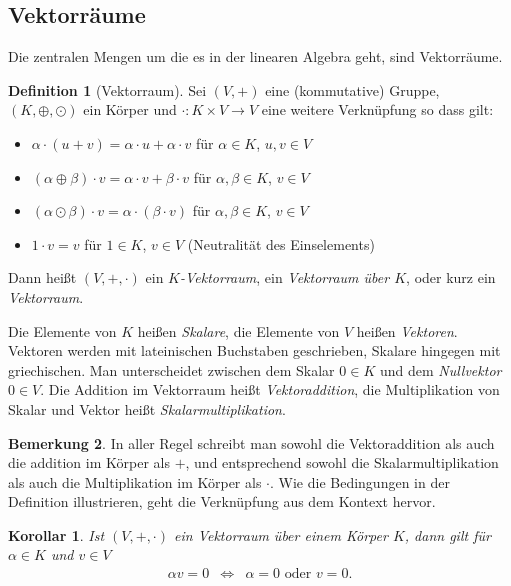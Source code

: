 \documentclass[index=totoc]{scrartcl}%
\newtheorem{cor}[thm]{Korollar}
\theoremstyle{definition}
\newtheorem{defi}{Definition}[section]
\newtheorem{bem}[defi]{Bemerkung}
\begin{document}
\subsection{Vektorräume}
\label{subsec:vectorspace}

Die zentralen Mengen um die es in der linearen Algebra geht,
sind Vektorräume.


\begin{defi}[Vektorraum]
  Sei $(V,+)$ eine (kommutative) Gruppe, $(K,\oplus,\odot)$ ein Körper
  und $\cdot\colon K\times V\to V$ eine weitere Verknüpfung so dass gilt: 
  \begin{itemize}
  \item
    $\alpha\cdot(u+v)=\alpha\cdot u+\alpha\cdot v$
    für $\alpha\in K$, $u,v\in V$
  \item 
    $(\alpha\oplus \beta)\cdot v=\alpha\cdot v+\beta\cdot v$
    für $\alpha,\beta\in K$, $v\in V$
  \item
    $(\alpha\odot\beta) \cdot v = \alpha \cdot (\beta \cdot v)$
    für $\alpha,\beta\in K$, $v\in V$
  \item 
    $1 \cdot v = v$ für $1\in K$, $v\in V$ (Neutralität des Einselements)
  \end{itemize}

  Dann heißt $(V,+,\cdot)$ ein {\em $K$-Vektorraum},
  ein {\em Vektorraum über $K$}, oder kurz ein {\em Vektorraum}.

  Die Elemente von $K$ heißen {\em Skalare},
  die Elemente von $V$ heißen {\em Vektoren}.
  Vektoren werden mit lateinischen Buchstaben geschrieben,
  Skalare hingegen mit griechischen.
  Man unterscheidet zwischen dem Skalar $0\in K$
  und dem {\em Nullvektor} $0\in V$. 
  Die Addition im Vektorraum heißt {\em Vektoraddition},
  die Multiplikation von Skalar und Vektor heißt {\em Skalarmultiplikation}. 
\end{defi}

\begin{bem}
  In aller Regel schreibt man sowohl die Vektoraddition
  als auch die addition im Körper als $+$,
  und entsprechend sowohl die Skalarmultiplikation
  als auch die Multiplikation im Körper als $\cdot$.
  Wie die Bedingungen in der Definition illustrieren,
  geht die Verknüpfung aus dem Kontext hervor. 
\end{bem}

\begin{cor}\label{cor:factor0V}
  Ist $(V, +, \cdot)$ ein Vektorraum über einem Körper $K$,
  dann gilt für $\alpha\in K$ und $v\in V$
  \begin{eqnarray*}
    \alpha v=0 & \iff & \alpha=0\text{ oder }v=0. 
  \end{eqnarray*}
\end{cor}
\end{document}
